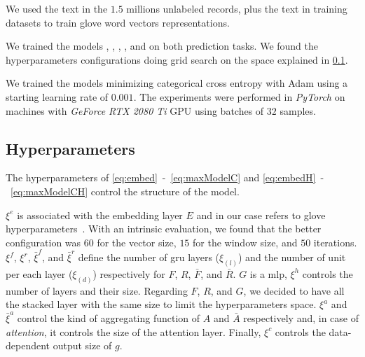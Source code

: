 We used the text in the $1.5$ millions unlabeled records, plus the
text in training datasets to train \ac{glove} word
vectors representations.

We trained the models \maxp{}, \softmax{}, \maxi{}, \maxh{}, and
\softmaxh{} on both prediction tasks. We found the hyperparameters 
configurations doing grid search on the space explained in
\cref{sec:hyperparameters}. 

We trained the models minimizing categorical cross entropy with Adam
\cite{kingma2014adam} using a starting learning rate of $0.001$. The
experiments were performed in \emph{PyTorch} on machines with
\emph{GeForce RTX 2080 Ti} 
GPU using batches of $32$ samples.



\subsection{Hyperparameters}\label{sec:hyperparameters}
The hyperparameters of \eqref{eq:embed}~-~\eqref{eq:maxModelC}
and \eqref{eq:embedH}~-~\eqref{eq:maxModelCH} control the structure of
the model.

$\xi^e$ is associated with the embedding layer $E$ and in our case
refers to \ac{glove} 
hyperparameters~\cite{pennington_glove:_2014}. With an intrinsic
evaluation, we found that the better configuration was $60$ for the vector
size, $15$ for the window size, and $50$ iterations. $\xi^f$,
$\xi^r$, $\bar{\xi}^{f}$, and $\bar{\xi}^{r}$ define the number of
\ac{gru} layers ($\xi_{(l)}$) and the number of unit per each layer
($\xi_{(d)}$) respectively for $F$, $R$, $\bar{F}$, and $\bar{R}$. 
$G$ is a \ac{mlp}, $\xi^h$ controls the number of
layers and their size. Regarding $F$, $R$, and $G$, we decided to
have all the stacked layer with 
the same size to limit the
hyperparameters space. $\xi^a$ and $\bar{\xi}^a$ control the
kind of aggregating function of $A$ and $\bar{A}$ respectively and, in case
of \emph{attention}, 
it controls the size of the attention layer. Finally, $\xi^c$ controls the
data-dependent output size of $g$.

